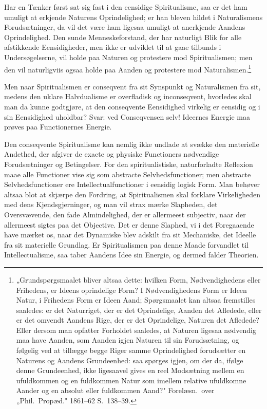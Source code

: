 \documentclass[12pt]{book}
\newcommand{\opage}[1]{\marginnote{\footnotesize\textit{[#1]}}}
\begin{document}
\opage{453} Har en Tænker først sat sig fast i den eensidige Spiritualisme, saa er det ham umuligt at erkjende
Naturens Oprindelighed; er han bleven hildet i Naturalismens Forudsætninger, da vil det være ham
ligesaa umuligt at anerkjende Aandens Oprindelighed. Den sunde Menneskeforstand, der har naturligt
Blik for alle afstikkende Eensidigheder, men ikke er udviklet til at gaae tilbunds i Undersøgelserne,
vil holde paa Naturen og protestere mod Spiritualismen; men den vil naturligviis ogsaa holde paa
Aanden og protestere mod Naturalismen.\footnote{„Grundspørgsmaalet bliver altsaa dette: hvilken Form,
Nødvendighedens eller Frihedens, er Ideens oprindelige Form? I Nødvendighedens Form er Ideen Natur, i
Frihedens Form er Ideen Aand; Spørgsmaalet kan altsaa fremstilles saaledes: er det Naturriget, der er
det Oprindelige, Aanden det Afledede, eller er det omvendt Aandens Rige, der er det Oprindelige,
Naturen det Afledede? Eller dersom man opfatter Forholdet saaledes, at Naturen ligesaa nødvendig maa
have Aanden, som Aanden igjen Naturen til sin Forudsætning, og følgelig ved at tillægge begge Riger
samme Oprindelighed forudsætter en Naturens og Aandens Grundeenhed: saa spørges igjen, om der da,
ifølge denne Grundeenhed, ikke ligesaavel gives en reel Modsætning mellem en ufuldkommen og en
fuldkommen Natur som imellem relative ufuldkomne Aander og en absolut eller fuldkommen Aand?"
Forelæsn.\ over „Phil.\ Propæd." 1861--62 S.~138--39.}

Men naar Spiritualismen er conseqvent fra sit Synspunkt og Naturalismen fra sit, medens den uklare
Halvdualisme er overfladisk og inconseqvent, hvorledes skal man da kunne godtgjøre, at den conseqvente
Eensidighed virkelig er eensidig og i sin Eensidighed uholdbar? Svar: ved Conseqvensen selv! Ideernes
Energie maa prøves paa Functionernes Energie.

Den conseqvente Spiritualisme kan nemlig ikke undlade at svække den materielle Andethed, der afgiver
de exacte
\opage{454} og physiske Functioners nødvendige Forudsætninger og Betingelser. For den spiritualistiske,
naturforladte Reflexion maae alle Functioner vise sig som abstracte Selvhedsfunctioner; men abstracte
Selvhedsfunctioner ere Intellectualfunctioner i eensidig logisk Form. Man behøver altsaa blot at
skjærpe den Fordring, at Spiritualismen skal forklare Virkeligheden med dens Kjendsgjerninger, og man
vil strax mærke Slapheden, det Oversvævende, den fade Almindelighed, der er allermeest subjectiv, naar
der allermeest sigtes paa det Objective. Det er denne Slaphed, vi i det Foregaaende have mærket os,
naar det Dynamiske blev adskilt fra sit Mechaniske, det Ideelle fra sit materielle Grundlag. Er
Spiritualismen paa denne Maade forvandlet til Intellectualisme, saa taber Aandens Idee sin Energie, og
dermed falder Theorien.
\end{document}
